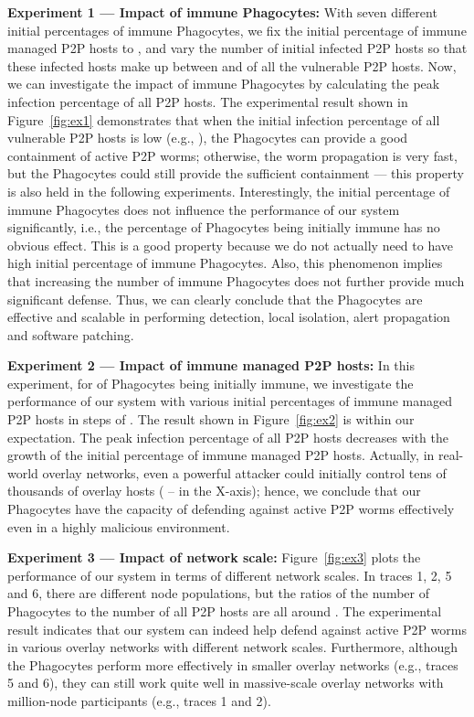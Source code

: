 \documentclass[times,10pt,twocolumn]{article}
\begin{document}
\textbf{Experiment 1 --- Impact of immune Phagocytes:} With seven
different initial percentages of immune Phagocytes, we fix the
initial percentage of immune managed P2P hosts to , and vary
the number of initial infected P2P hosts so that these infected
hosts make up between  and  of all the vulnerable
P2P hosts. Now, we can investigate the impact of immune Phagocytes
by calculating the peak infection percentage of all P2P hosts. The
experimental result shown in Figure~\ref{fig:ex1} demonstrates that
when the initial infection percentage of all vulnerable P2P hosts is
low (e.g., ), the Phagocytes can provide a good containment
of active P2P worms; otherwise, the worm propagation is very fast,
but the Phagocytes could still provide the sufficient containment
--- this property is also held in the following experiments.
Interestingly, the initial percentage of immune Phagocytes does not
influence the performance of our system significantly, i.e., the
percentage of Phagocytes being initially immune has no obvious
effect. This is a good property because we do not actually need to
have high initial percentage of immune Phagocytes. Also, this
phenomenon implies that increasing the number of immune Phagocytes
does not further provide much significant defense. Thus, we can
clearly conclude that the Phagocytes are effective and scalable in
performing detection, local isolation, alert propagation and
software patching.









\textbf{Experiment 2 --- Impact of immune managed P2P hosts:} In
this experiment, for  of Phagocytes being initially immune, we
investigate the performance of our system with various initial
percentages of immune managed P2P hosts in steps of . The
result shown in Figure~\ref{fig:ex2} is within our expectation. The
peak infection percentage of all P2P hosts decreases with the growth
of the initial percentage of immune managed P2P hosts. Actually, in
real-world overlay networks, even a powerful attacker could
initially control tens of thousands of overlay hosts ( -- 
in the X-axis); hence, we conclude that our Phagocytes have the
capacity of defending against active P2P worms effectively even in a
highly malicious environment.







\textbf{Experiment 3 --- Impact of network scale:}
Figure~\ref{fig:ex3} plots the performance of our system in terms of
different network scales. In traces 1, 2, 5 and 6, there are
different node populations, but the ratios of the number of
Phagocytes to the number of all P2P hosts are all around . The
experimental result indicates that our system can indeed help defend
against active P2P worms in various overlay networks with different
network scales. Furthermore, although the Phagocytes perform more
effectively in smaller overlay networks (e.g., traces 5 and 6), they
can still work quite well in massive-scale overlay networks with
million-node participants (e.g., traces 1 and 2).
\end{document}
